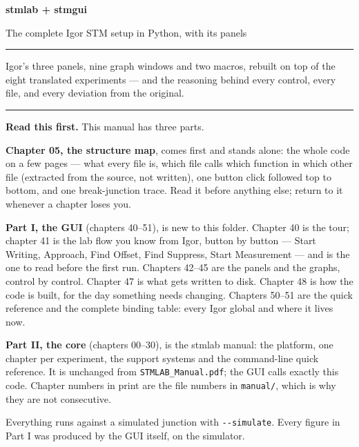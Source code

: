 \begin{titlepage}
\vspace*{28mm}
{\Huge\bfseries\color{accent} stmlab + stmgui\par}
\vspace{4mm}
{\Large The complete Igor STM setup in Python, with its panels\par}
\vspace{14mm}
\rule{\linewidth}{0.6pt}
\vspace{4mm}

{\large Igor's three panels, nine graph windows and two macros, rebuilt on
top of the eight translated experiments --- and the reasoning behind every
control, every file, and every deviation from the original.\par}

\vspace{4mm}
\rule{\linewidth}{0.6pt}

\vspace{18mm}
\begin{keybox}
\textbf{Read this first.} This manual has three parts.

\textbf{Chapter 05, the structure map}, comes first and stands alone: the
whole code on a few pages --- what every file is, which file calls which
function in which other file (extracted from the source, not written), one
button click followed top to bottom, and one break-junction trace. Read it
before anything else; return to it whenever a chapter loses you.

\textbf{Part I, the GUI} (chapters 40--51), is new to this folder. Chapter 40
is the tour; chapter 41 is the lab flow you know from Igor, button by
button --- Start Writing, Approach, Find Offset, Find Suppress, Start
Measurement --- and is the one to read before the first run. Chapters
42--45 are the panels and the graphs, control by control. Chapter 47 is
what gets written to disk. Chapter 48 is how the code is built, for the day
something needs changing. Chapters 50--51 are the quick reference and the
complete binding table: every Igor global and where it lives now.

\textbf{Part II, the core} (chapters 00--30), is the stmlab manual: the
platform, one chapter per experiment, the support systems and the
command-line quick reference. It is unchanged from
\texttt{STMLAB\_Manual.pdf}; the GUI calls exactly this code. Chapter
numbers in print are the file numbers in \texttt{manual/}, which is why
they are not consecutive.

\medskip
Everything runs against a simulated junction with \texttt{-{}-simulate}.
Every figure in Part I was produced by the GUI itself, on the simulator.
\end{keybox}


\end{titlepage}
